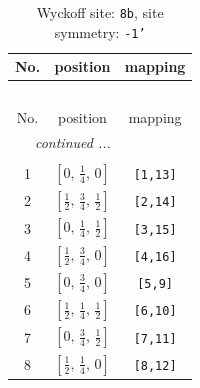 \documentclass[fleqn,8pt]{jsarticle}
\begin{document}
\begin{longtable}{ccc}
\caption{Wyckoff site: {\tt 8b}, site symmetry: {\tt -1'}}
 \\
 \hline \hline
No. & position & mapping \\ \hline \endfirsthead

\multicolumn{2}{l}{\tablename\ \thetable{}} \\
 \hline \hline
No. & position & mapping \\ \hline \endhead

 \hline \hline
\multicolumn{2}{r}{\footnotesize\it continued ...} \\ \endfoot

 \hline \hline
\multicolumn{2}{r}{} \\ \endlastfoot

1 & $\left[ 0,\, \frac{1}{4},\, 0 \right]$ & {\tt [1,13]} \\ \hline
2 & $\left[ \frac{1}{2},\, \frac{3}{4},\, \frac{1}{2} \right]$ & {\tt [2,14]} \\ \hline
3 & $\left[ 0,\, \frac{1}{4},\, \frac{1}{2} \right]$ & {\tt [3,15]} \\ \hline
4 & $\left[ \frac{1}{2},\, \frac{3}{4},\, 0 \right]$ & {\tt [4,16]} \\ \hline
5 & $\left[ 0,\, \frac{3}{4},\, 0 \right]$ & {\tt [5,9]} \\ \hline
6 & $\left[ \frac{1}{2},\, \frac{1}{4},\, \frac{1}{2} \right]$ & {\tt [6,10]} \\ \hline
7 & $\left[ 0,\, \frac{3}{4},\, \frac{1}{2} \right]$ & {\tt [7,11]} \\ \hline
8 & $\left[ \frac{1}{2},\, \frac{1}{4},\, 0 \right]$ & {\tt [8,12]} \\
\end{longtable}
\renewcommand{\arraystretch}{1.2}
\end{document}
